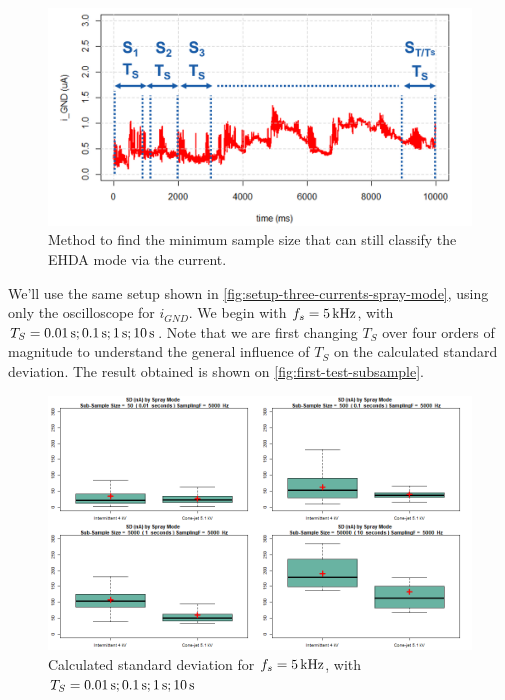 \documentclass[oneside,12pt]{article}
\begin{document}
\begin{figure}[h!]
    \centering
    \includegraphics[width=.8\textwidth,trim=1 1 1 1,clip]{figures/subsample-size-strategy.png}
    \caption{Method to find the minimum sample size that can still classify the EHDA mode via the current.}
    \label{fig:subsample-size-strategy}
\end{figure}

We'll use the same setup shown in \autoref{fig:setup-three-currents-spray-mode}, using only the oscilloscope for $i_{GND}$.
We begin with $f_s = 5 \,\mathrm{kHz}$, with $T_S = 0.01 \,\mathrm{s}; 0.1 \,\mathrm{s}; 1 \,\mathrm{s}; 10 \,\mathrm{s}$. Note that we are first changing
$T_S$ over four orders of magnitude to understand the general influence of $T_S$ on the calculated standard deviation.
The result obtained is shown on \autoref{fig:first-test-subsample}.

\begin{figure}[h!]
    \centering
    \includegraphics[width=\textwidth,trim=1 1 1 1,clip]{figures/first-test-subsample.png}
    \caption{Calculated standard deviation for $f_s = 5 \,\mathrm{kHz}$, with $T_S = 0.01 \,\mathrm{s}; 0.1 \,\mathrm{s}; 1 \,\mathrm{s}; 10 \,\mathrm{s}$}
    \label{fig:first-test-subsample}
\end{figure}
\end{document}
